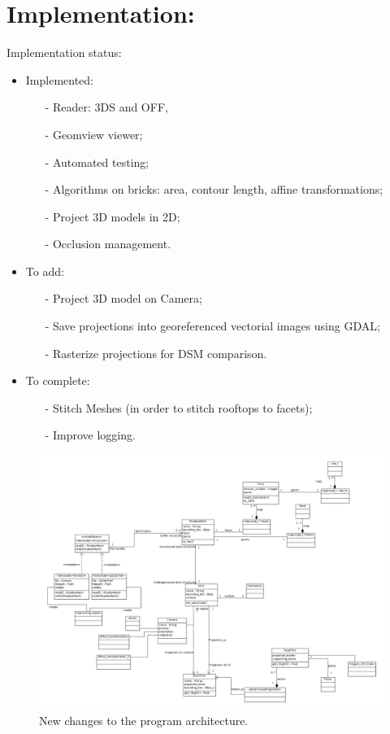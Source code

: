 \documentclass[a4paper, 11pt]{article}
\begin{document}
	\section*{Implementation:}
	Implementation status:
	\begin{itemize}
		\item Implemented:
			\begin{itemize}
				\item[-] Reader: 3DS and OFF,
				\item[-] Geomview viewer;
				\item[-] Automated testing;
				\item[-] Algorithms on bricks: area, contour length, affine transformations;
				\item[-] Project 3D models in 2D;
				\item[-] Occlusion management.
			\end{itemize}
		\item To add:
			\begin{itemize}
				\item[-] Project 3D model on Camera;
				\item[-] Save projections into georeferenced vectorial images using GDAL;
				\item[-] Rasterize projections for DSM comparison.
			\end{itemize}
		\item To complete:
			\begin{itemize}
				\item[-] Stitch Meshes (in order to stitch rooftops to facets);
				\item[-] Improve logging.
			\end{itemize}
	\end{itemize}
	
	\begin{figure}[H]
		\caption{\label{diag::class} New changes to the program architecture.}
		\includegraphics[scale=.3]{images/vectorial/class_diagram.png}
	\end{figure}
	
\end{document}
